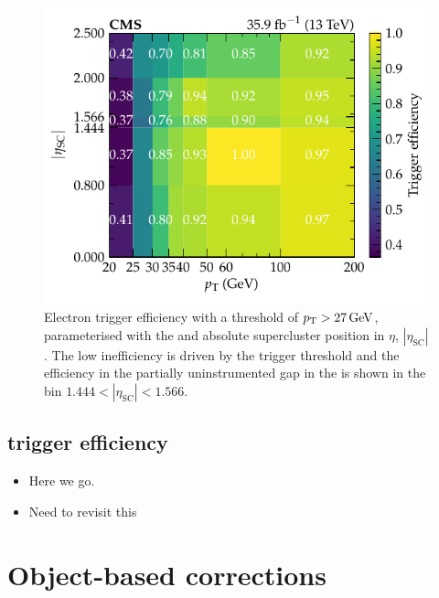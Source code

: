 \begin{figure}[htbp]
    \centering
    \includegraphics{chapters/041_corrections/images/efficiencies/triggers/electrons/electron_trigger_efficiency.pdf}
    \caption{
        Electron trigger efficiency with a threshold of ${p_{\text{T}}>\SI{27}{GeV}}$, parameterised with the \pt and absolute supercluster position in $\eta$, $|\eta_{\mathrm{SC}}|$. The low \pt inefficiency is driven by the trigger threshold and the efficiency in the partially uninstrumented gap in the \ECAL is shown in the bin ${1.444<|\eta_{\mathrm{SC}}|<1.566}$.
    }
    \label{fig:electron-trigger-efficiency}
\end{figure}


\subsection{\ptmiss trigger efficiency}

\begin{itemize}
    \item Here we go.
    \item Need to revisit this
\end{itemize}



\section{Object-based corrections}


